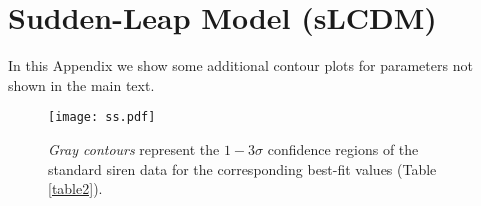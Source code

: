 \documentclass[universe,article,accept,moreauthors,pdftex]{Definitions/mdpi}
\begin{document}











\appendixstart

\appendix



\section[\appendixname~\thesection]{Sudden-Leap Model (sLCDM)}
\label{AppendixΑ}
In this Appendix we show some additional contour plots for parameters not shown in the main text.
 \begin{figure}[H] 
    \texttt{[image: ss.pdf]}
    \caption{\textit{Gray contours} represent the $1-3\sigma$ confidence regions of the standard siren data  for the corresponding best-fit values (Table \ref{table2}). }
    \label{DataA1}
\end{figure}
 
\end{document}

